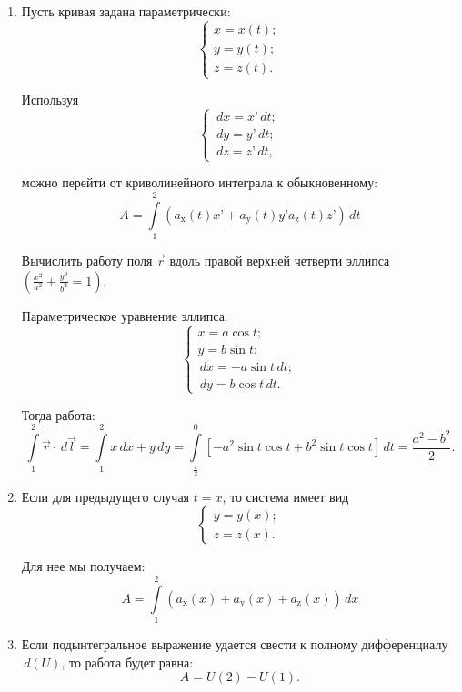 	\begin{enumerate}
	\item Пусть кривая задана параметрически:
	\[ \left\{ \begin{array}{l}
		x = x(t); \\
		y = y(t); \\
		z = z(t).
	\end{array} \right. \]
	
	Используя
	\[ \left\{ \begin{array}{l}
		\,d x = x’\,d t; \\
		\,d y = y’\,d t; \\
		\,d z = z’\,d t,
	\end{array} \right. \]
	
	можно перейти от криволинейного интеграла к обыкновенному:
	\[ A = \int\limits_1^2 (a_\mathrm{x}(t)x’ + a_\mathrm{y}(t)y’ a_\mathrm{z}(t)z’)\,d t \]
	
	\begin{example}
	Вычислить работу поля \( \vec{r} \) вдоль правой верхней четверти эллипса \( \left(\frac{x^2}{a^2} + \frac{y^2}{b^2} = 1\right) \).
	\end{example}
	
	\begin{solution}
	Параметрическое уравнение эллипса:
	\[ \left\{ \begin{array}{l}
		x = a\cos t; \\
		y = b\sin t; \\
		\,d x = -a\sin t\,d t; \\
		\,d y = b\cos t\,d t.
	\end{array} \right. \]
	
	Тогда работа:
	\[ \int\limits_1^2 \vec{r}\cdot\,d\vec{l} = \int\limits_1^2 x\,d x + y\,d y = \int\limits_\frac{\pi}{2}^0 [-a^2\sin t\cos t + b^2\sin t\cos t]\,d t = \frac{a^2 - b^2}{2}. \]
	\end{solution}	

	\item Если для предыдущего случая \( t = x \), то система имеет вид
	\[ \left\{ \begin{array}{l}
		y = y(x); \\
		z = z(x).
	\end{array} \right. \]
	
	Для нее мы получаем:
	\[ A = \int\limits_1^2 (a_\mathrm{x}(x) + a_\mathrm{y}(x) + a_\mathrm{z}(x))\,d x \]
	
	\item Если подынтегральное выражение удается свести к полному дифференциалу \( \,d(U) \), то работа будет равна:
	\[ A = U(2) - U(1). \]
	

\end{enumerate}
